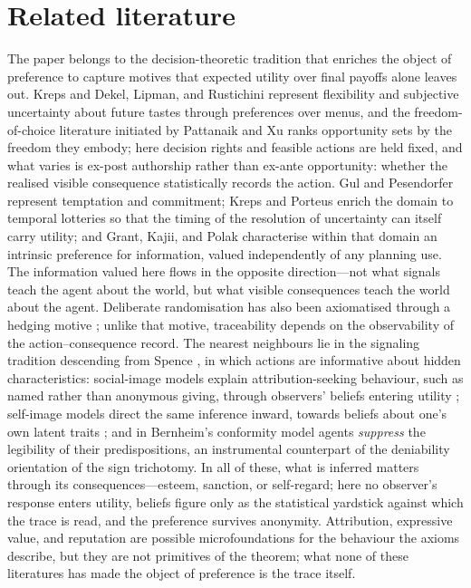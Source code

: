 \documentclass[11pt,a4paper]{article}
\theoremstyle{definition}
\newcommand{\1}{\mathbf 1}
\begin{document}
\section{Related literature}\label{sec:literature}

The paper belongs to the decision-theoretic tradition that enriches the object of preference to capture motives that
expected utility over final payoffs alone leaves out.  Kreps \cite{Kreps1979} and Dekel, Lipman, and Rustichini
\cite{DekelLipmanRustichini2001} represent flexibility and subjective uncertainty about future tastes through
preferences over menus, and the freedom-of-choice literature initiated by Pattanaik and Xu \cite{PattanaikXu1990}
ranks opportunity sets by the freedom they embody; here decision rights and feasible actions are held fixed, and what
varies is ex-post authorship rather than ex-ante opportunity: whether the realised visible consequence statistically
records the action.  Gul and Pesendorfer \cite{GulPesendorfer2001} represent temptation and commitment; Kreps and
Porteus \cite{KrepsPorteus1978} enrich the domain to temporal lotteries so that the timing of the resolution of
uncertainty can itself carry utility; and Grant, Kajii, and Polak \cite{GrantKajiiPolak1998} characterise within that
domain an intrinsic preference for information, valued independently of any planning use.  The information valued
here flows in the opposite direction---not what signals teach the agent about the world, but what visible consequences
teach the world about the agent.  Deliberate randomisation has also been axiomatised through a hedging motive
\cite{CerreiaVioglioDillenbergerOrtolevaRiella2019}; unlike that motive, traceability depends on the observability of
the action--consequence record.  The nearest neighbours lie in the signaling tradition descending from Spence
\cite{Spence1973}, in which actions are informative about hidden characteristics: social-image models explain
attribution-seeking behaviour, such as named rather than anonymous giving, through observers' beliefs entering utility
\cite{GlazerKonrad1996,BenabouTirole2006,AndreoniBernheim2009}; self-image models direct the same inference inward,
towards beliefs about one's own latent traits \cite{BenabouTirole2002}; and in Bernheim's conformity model
\cite{Bernheim1994} agents \emph{suppress} the legibility of their predispositions, an instrumental counterpart of
the deniability orientation of the sign trichotomy.  In all of these, what is inferred matters through its
consequences---esteem, sanction, or self-regard; here no observer's response enters utility, beliefs figure only as
the statistical yardstick against which the trace is read, and the preference survives anonymity.  Attribution,
expressive value, and reputation are possible microfoundations for the behaviour the axioms describe, but they are
not primitives of the theorem; what none of these literatures has made the object of preference is the trace itself.
\end{document}
